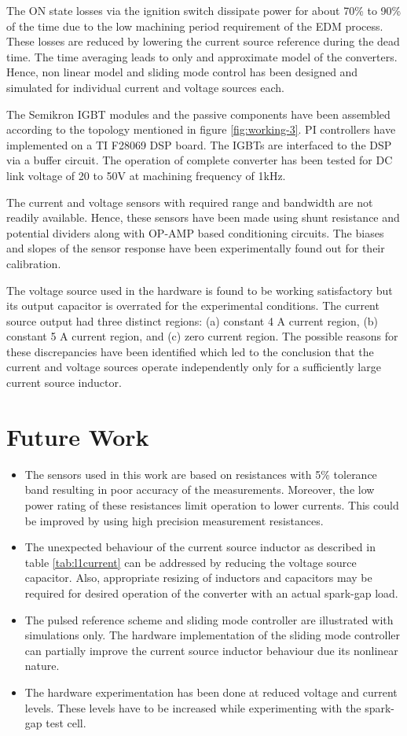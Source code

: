 	The ON state losses via the ignition switch dissipate power for about 70\% to 90\% of the time due to the low machining period requirement of the EDM process. These losses are reduced by lowering the current source reference during the dead time. The time averaging leads to only and approximate model of the converters. Hence, non linear model and sliding mode control has been designed and simulated for individual current and voltage sources each.
	
	The Semikron IGBT modules and the passive components have been assembled according to the topology mentioned in figure \ref{fig:working-3}.  PI controllers have implemented on a TI F28069 DSP board. The IGBTs are interfaced to the DSP via a buffer circuit. The operation of complete converter has been tested for DC link voltage of 20 to 50V at machining frequency of 1kHz.

	The current and voltage sensors with required range and bandwidth are not readily available. Hence, these sensors have been made using shunt resistance and potential dividers along with OP-AMP based conditioning circuits. The biases and slopes of the sensor response have been experimentally found out for their calibration.
	
	The voltage source used in the hardware is found to be working satisfactory but its output capacitor is overrated for the experimental conditions. The current source output had three distinct regions: (a) constant 4 A current region, (b) constant 5 A current region, and (c) zero current region. The possible reasons for these discrepancies have been identified which led to the conclusion that the current and voltage sources operate independently only for a sufficiently large current source inductor.

\section{Future Work}
\begin{itemize}
\item The sensors used in this work are based on resistances with 5\% tolerance band resulting in poor accuracy of the measurements. Moreover, the low power rating of these resistances limit operation to lower currents. This could be improved by using high precision measurement resistances.
\item The unexpected behaviour of the current source inductor as described in table \ref{tab:l1current} can be addressed by reducing the voltage source capacitor. Also, appropriate resizing of inductors and capacitors may be required for desired operation of the converter with an actual spark-gap load.
\item The pulsed reference scheme and sliding mode controller are illustrated with simulations only. The hardware implementation of the sliding mode controller can partially improve the current source inductor behaviour due its nonlinear nature.
\item The hardware experimentation has been done at reduced voltage and current levels. These levels have to be increased while experimenting with the spark-gap test cell.
\end{itemize}
	
